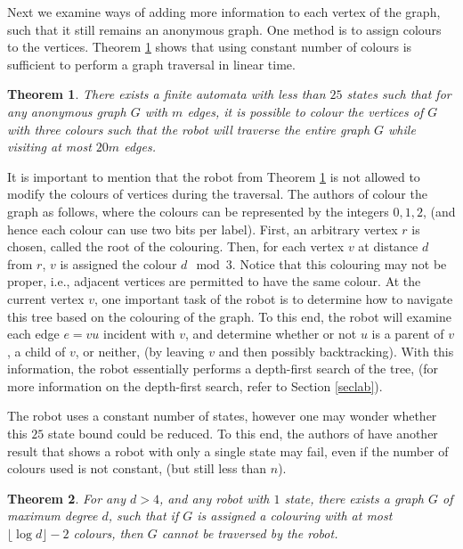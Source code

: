 \documentclass[12pt,letterpaper,oneside]{book}
\newtheorem{theorem}{Theorem}[section]
\begin{document}
Next we examine ways of adding more information to each vertex of the graph, such that it still remains an anonymous graph.  
One method is to assign colours to the vertices.   Theorem \ref{col} 
shows that using constant number of colours is sufficient to perform a graph traversal in linear time.  


\begin{theorem}\label{col}
\emph{\cite{CFIKP}} There exists a finite automata with less than $25$ states such that for any anonymous graph $G$ with $m$ edges, it is possible 
to colour the vertices of $G$ with three colours such that the robot will traverse the entire graph $G$ while visiting at most $20m$ edges.  
\end{theorem}

It is important to mention that the robot from Theorem \ref{col} is not allowed to modify the colours of vertices during the traversal.  
The authors of \cite{CFIKP} colour the graph as follows, where 
the colours can be represented by the integers $0,1,2$, (and hence each colour can use two bits per label).  First, an 
arbitrary vertex $r$ is chosen, called the root of the colouring.  Then, for each vertex $v$ at distance $d$ from $r$, $v$ is assigned 
the colour $d\mod 3$.  Notice that this colouring may not be proper, i.e., adjacent vertices are permitted to have the same colour.  
At the current vertex $v$, 
one important task of the robot is to determine how to navigate this tree based on the colouring of the graph.  To this end, 
the robot will examine each edge $e=vu$ incident 
with $v$, and determine whether or not $u$ is a parent of $v$, a child of $v$, or neither, (by leaving $v$ and then possibly backtracking).  
With this information, the robot essentially 
performs a depth-first search of the tree, (for more information on the depth-first search, refer to Section \ref{seclab}).  


The robot uses a constant number of states, however 
one may wonder whether this $25$ state bound could be reduced.  
To this end, the authors of \cite{CFIKP} have another result that 
shows a robot with only a single state may fail, even if the number of colours used is not 
constant, (but still less than $n$).  

\begin{theorem}\label{col2}
\emph{\cite{CFIKP}} For any $d>4$, and any robot with $1$ state, there 
exists a graph $G$ of maximum degree $d$, such that if $G$ is assigned a colouring 
with at most $\lfloor \log d \rfloor -2$ colours, then $G$ cannot be traversed by the robot.  
\end{theorem}  
\end{document}
